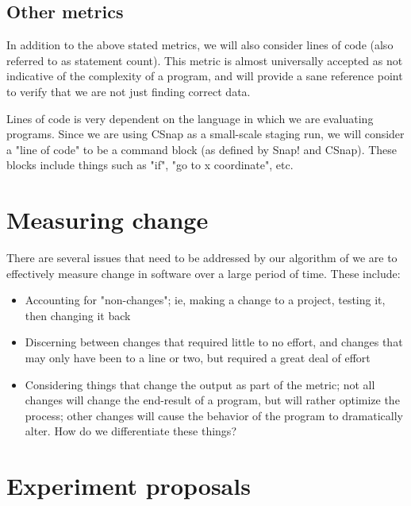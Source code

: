 \documentclass[]{article}
\begin{document}
\subsection{Other metrics}

In addition to the above stated metrics, we will also consider lines of code (also referred to as statement count).
This metric is almost universally accepted as not indicative of the complexity of a program, and will provide a sane reference point to verify that we are not just finding correct data.

Lines of code is very dependent on the language in which we are evaluating programs.
Since we are using CSnap as a small-scale staging run, we will consider a "line of code" to be a command block (as defined by Snap! and CSnap).
These blocks include things such as "if", "go to {x coordinate}", etc.

\section{Measuring change}




There are several issues that need to be addressed by our algorithm of we are to effectively measure change in software over a large period of time.
These include:
\begin{itemize}
	\item Accounting for "non-changes"; ie, making a change to a project, testing it, then changing it back
	\item Discerning between changes that required little to no effort, and changes that may only have been to a line or two, but required a great deal of effort
	\item Considering things that change the output as part of the metric; not all changes will change the end-result of a program, but will rather optimize the process; other changes will cause the behavior of the program to dramatically alter. How do we differentiate these things?
\end{itemize}

\section{Experiment proposals}
\end{document}
